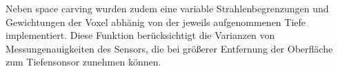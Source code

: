 Neben space carving wurden zudem eine variable Strahlenbegrenzungen und Gewichtungen der Voxel abhänig von der jeweils aufgenommenen Tiefe implementiert. Diese Funktion berücksichtigt die Varianzen von Messungenauigkeiten des Sensors, die bei größerer Entfernung der Oberfläche zum Tiefensonsor zunehmen können. \citep{Klingensmith_2015_7924}
